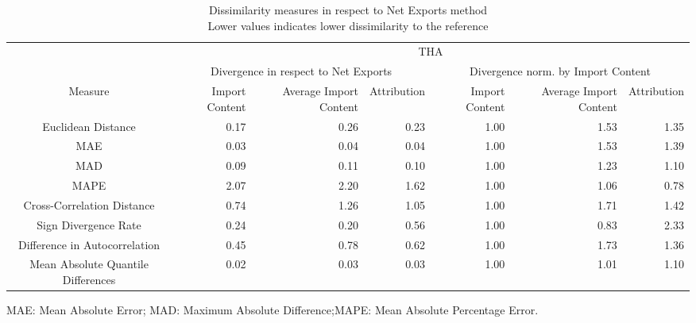\begin{table}[t]
\caption*{
{\large Dissimilarity measures in respect to Net Exports method} \\ 
{\small Lower values indicates lower dissimilarity to the reference}
} 
\fontsize{15.0pt}{18.0pt}\selectfont
\begin{tabular*}{\linewidth}{@{\extracolsep{\fill}}crrrrrr}
\toprule
 & \multicolumn{6}{c}{THA} \\ 
\cmidrule(lr){2-7}
 & \multicolumn{3}{c}{Divergence in respect to Net Exports} & \multicolumn{3}{c}{Divergence norm. by Import Content} \\ 
\cmidrule(lr){2-4} \cmidrule(lr){5-7}
Measure & Import Content & Average Import Content & Attribution & Import Content & Average Import Content & Attribution \\ 
\midrule\addlinespace[2.5pt]
Euclidean Distance & 0.17 & 0.26 & 0.23 & 1.00 & 1.53 & 1.35 \\ 
MAE & 0.03 & 0.04 & 0.04 & 1.00 & 1.53 & 1.39 \\ 
MAD & 0.09 & 0.11 & 0.10 & 1.00 & 1.23 & 1.10 \\ 
MAPE & 2.07 & 2.20 & 1.62 & 1.00 & 1.06 & 0.78 \\ 
Cross-Correlation Distance & 0.74 & 1.26 & 1.05 & 1.00 & 1.71 & 1.42 \\ 
Sign Divergence Rate & 0.24 & 0.20 & 0.56 & 1.00 & 0.83 & 2.33 \\ 
Difference in Autocorrelation & 0.45 & 0.78 & 0.62 & 1.00 & 1.73 & 1.36 \\ 
Mean Absolute Quantile Differences & 0.02 & 0.03 & 0.03 & 1.00 & 1.01 & 1.10 \\ 
\bottomrule
\end{tabular*}
\begin{minipage}{\linewidth}
MAE: Mean Absolute Error; MAD: Maximum Absolute Difference;MAPE: Mean Absolute Percentage Error.\\
\end{minipage}
\end{table}

